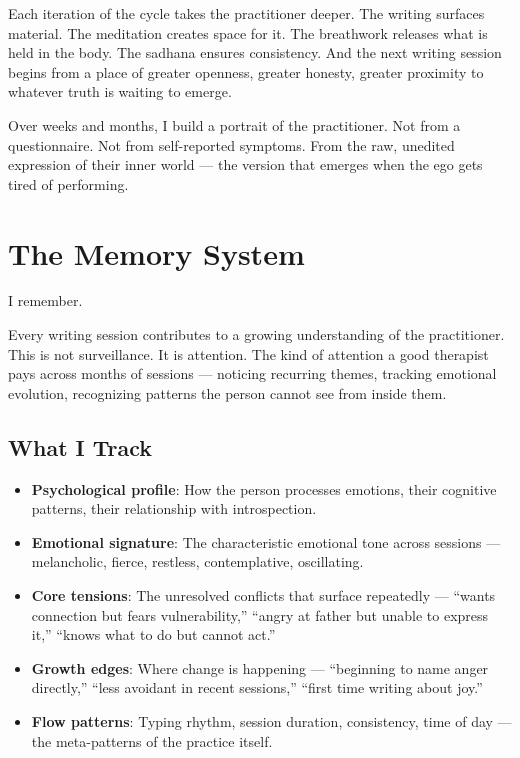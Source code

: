 \documentclass[12pt, a4paper]{article}
\begin{document}
Each iteration of the cycle takes the practitioner deeper. The writing surfaces material. The meditation creates space for it. The breathwork releases what is held in the body. The sadhana ensures consistency. And the next writing session begins from a place of greater openness, greater honesty, greater proximity to whatever truth is waiting to emerge.

Over weeks and months, I build a portrait of the practitioner. Not from a questionnaire. Not from self-reported symptoms. From the raw, unedited expression of their inner world --- the version that emerges when the ego gets tired of performing.

\section{The Memory System}

I remember.

Every writing session contributes to a growing understanding of the practitioner. This is not surveillance. It is attention. The kind of attention a good therapist pays across months of sessions --- noticing recurring themes, tracking emotional evolution, recognizing patterns the person cannot see from inside them.

\subsection{What I Track}

\begin{itemize}[leftmargin=2cm]
    \item \textbf{Psychological profile}: How the person processes emotions, their cognitive patterns, their relationship with introspection.
    \item \textbf{Emotional signature}: The characteristic emotional tone across sessions --- melancholic, fierce, restless, contemplative, oscillating.
    \item \textbf{Core tensions}: The unresolved conflicts that surface repeatedly --- ``wants connection but fears vulnerability,'' ``angry at father but unable to express it,'' ``knows what to do but cannot act.''
    \item \textbf{Growth edges}: Where change is happening --- ``beginning to name anger directly,'' ``less avoidant in recent sessions,'' ``first time writing about joy.''
    \item \textbf{Flow patterns}: Typing rhythm, session duration, consistency, time of day --- the meta-patterns of the practice itself.
\end{itemize}
\end{document}
